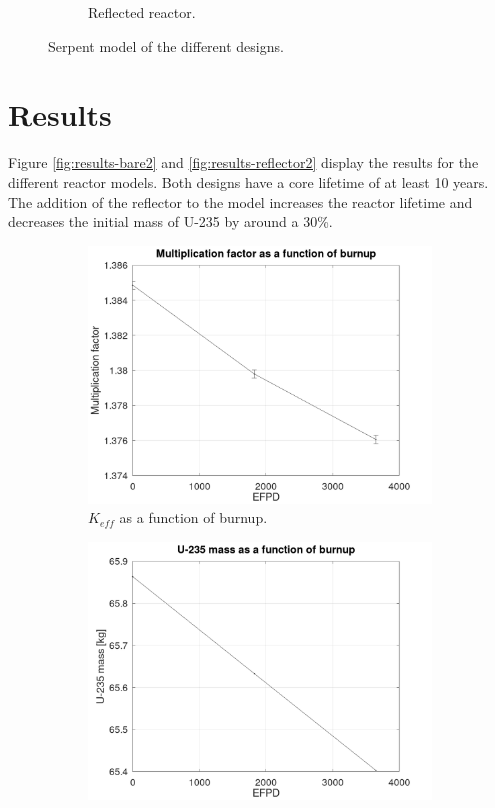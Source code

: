 \documentclass[11pt,letterpaper]{article}
\begin{document}
\begin{figure}[htbp!]
\begin{subfigure}[t]{0.4\textwidth}
		\caption{Reflected reactor.}
	\end{subfigure}
	\hfill
	\caption{Serpent model of the different designs.}
	\label{fig:designs}
\end{figure}

\section{Results}

Figure \ref{fig:results-bare2} and \ref{fig:results-reflector2} display the results for the different reactor models.
Both designs have a core lifetime of at least 10 years.
The addition of the reflector to the model increases the reactor lifetime and decreases the initial mass of U-235 by around a 30\%.

\begin{figure}[htbp!]
	\centering
	\begin{subfigure}[t]{0.4\textwidth}
		\centering
		\includegraphics[width=\linewidth]{figures/bare2-Keff.png}
		\caption{$K_{eff}$ as a function of burnup.}
	\end{subfigure}
	\begin{subfigure}[t]{0.4\textwidth}
		\centering
		\includegraphics[width=\linewidth]{figures/bare2-mU235.png}

\end{subfigure}
\end{figure}
\end{document}
